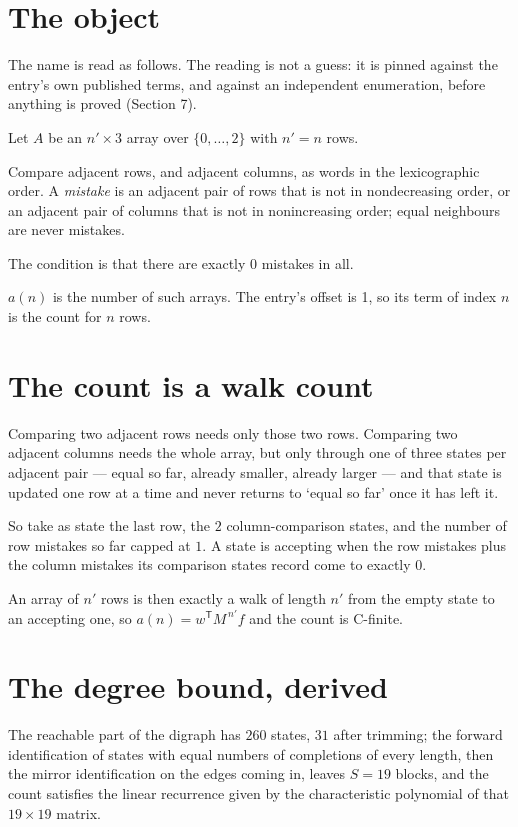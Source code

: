 \documentclass[11pt]{article}
\theoremstyle{definition}
\begin{document}
\section{The object}

The name is read as follows. The reading is not a guess: it is pinned against the entry's own published terms, and against an independent enumeration, before anything is proved (Section 7).

Let $A$ be an $n' \times 3$ array over $\{0,\dots,2\}$ with $n' = n$ rows.

Compare adjacent rows, and adjacent columns, as words in the lexicographic order. A {\itshape mistake} is an adjacent pair of rows that is not in nondecreasing order, or an adjacent pair of columns that is not in nonincreasing order; equal neighbours are never mistakes.

The condition is that there are exactly $0$ mistakes in all.

$a(n)$ is the number of such arrays. The entry's offset is 1, so its term of index $n$ is the count for $n$ rows.

\section{The count is a walk count}

Comparing two adjacent rows needs only those two rows. Comparing two adjacent columns needs the whole array, but only through one of three states per adjacent pair --- equal so far, already smaller, already larger --- and that state is updated one row at a time and never returns to `equal so far' once it has left it.

So take as state the last row, the $2$ column-comparison states, and the number of row mistakes so far capped at $1$. A state is accepting when the row mistakes plus the column mistakes its comparison states record come to exactly $0$.

An array of $n'$ rows is then exactly a walk of length $n'$ from the empty state to an accepting one, so $a(n) = w^{\mathsf T}M^{\,n'}f$ and the count is C-finite.

\section{The degree bound, derived}

The reachable part of the digraph has $260$ states, $31$ after trimming; the forward identification of states with equal numbers of completions of every length, then the mirror identification on the edges coming in, leaves $S = 19$ blocks, and the count satisfies the linear recurrence given by the characteristic polynomial of that $19\times19$ matrix.
\end{document}
